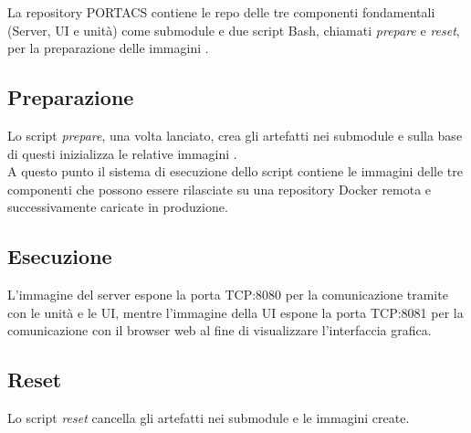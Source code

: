 La repository  PORTACS contiene le repo delle tre componenti fondamentali (Server, UI e unità) come submodule e due script Bash, chiamati \textit{prepare} e \textit{reset}, per la preparazione delle immagini .

\subsection{Preparazione}
Lo script \textit{prepare}, una volta lanciato, crea gli artefatti nei submodule e sulla base di questi inizializza le relative immagini .
\\A questo punto il sistema di esecuzione dello script contiene le immagini  delle tre componenti che possono essere rilasciate su una repository Docker remota e successivamente caricate in produzione.

\subsection{Esecuzione}
L'immagine del server espone la porta TCP:8080 per la comunicazione tramite  con le unità e le UI, mentre l'immagine della UI espone la porta TCP:8081 per la comunicazione  con il browser web al fine di visualizzare l'interfaccia grafica.

\subsection{Reset}
Lo script \textit{reset} cancella gli artefatti nei submodule e le immagini  create.